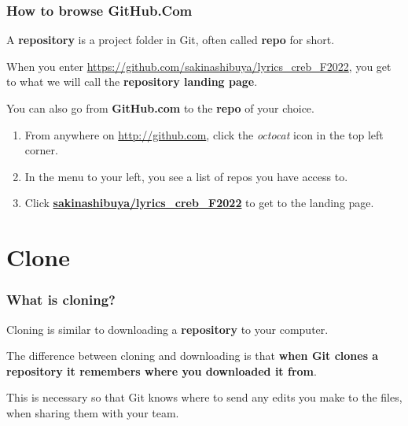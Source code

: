 \documentclass[aspectratio=169]{beamer} %
\newcommand*{\img}[1]{%
	\raisebox{-.3\baselineskip}{%
		\texttt{[image: \#1]}%
	}%
}
\newcommand{\trainingURL}[1]{{\color{blue}\url{#1}}}
\newcommand{\traininerUsername}{sakinashibuya}
\newcommand{\repoName}{\traininerUsername/lyrics_creb_F2022}
\newcommand{\trainingRepoURL}[1]{\trainingURL{https://github.com/\repoName #1}}
\begin{document}
\begin{frame}
\frametitle{How to browse GitHub.Com}

	A \textbf{repository} is a project folder in Git, often called \textbf{repo} for short.
	
	When you enter \trainingRepoURL{}, you get to what we will call the \textbf{repository landing page}.

	\vspace{.5cm}

	You can also go from \textbf{GitHub.com} to the \textbf{repo} of your choice.
	\begin{enumerate}
		\item From anywhere on \trainingURL{http://github.com}, click the \textit{octocat}  icon \img{img/octocat.png} in the top left corner.
		\item In the menu to your left, you see a list of repos you have access to.
		\item Click \textbf{\url{\repoName}} to get to the landing page.
	\end{enumerate}
	
\end{frame}

\section{Clone}

\begin{frame}
\frametitle{What is cloning?}

	Cloning is similar to downloading a \textbf{repository} to your computer.

	\vspace{.5cm}

	The difference between cloning and downloading is that \textbf{when Git clones a repository it remembers where you downloaded it from}. 

	\vspace{.5cm}
	
	This is necessary so that Git knows where to send any edits you make to the files, when sharing them with your team.

\end{frame}
\end{document}
